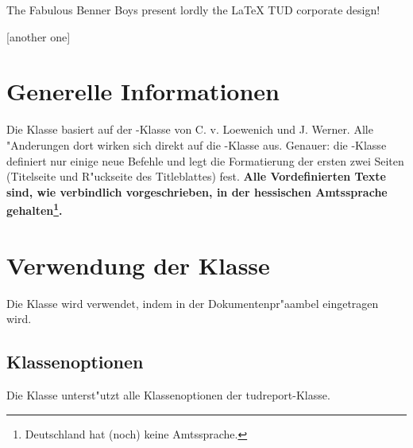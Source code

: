 \documentclass[article,dr=phil,type=drfinal,colorback,accentcolor=tud7b]{tudthesis}
\begin{document}
    {The Fabulous Benner Boys present lordly the {\LaTeX} TUD corporate design!}
  \author{Johnnie Walker}
  [another one]
  \dateofexam{\today}{\today}
  \makethesistitle

  \section{Generelle Informationen}
    Die Klasse basiert auf der -Klasse von C. v. Loewenich und
    J. Werner. Alle "Anderungen dort wirken sich direkt auf die
    -Klasse aus. Genauer: die -Klasse definiert nur einige
    neue Befehle und legt die Formatierung der ersten zwei Seiten (Titelseite
    und R"uckseite des Titleblattes) fest. \textbf{Alle Vordefinierten Texte sind, wie verbindlich vorgeschrieben, in der hessischen Amtssprache
    gehalten\footnote{Deutschland hat (noch) keine Amtssprache.}.}

  \section{Verwendung der Klasse}
    Die Klasse wird verwendet, indem in der Dokumentenpr"aambel
    eingetragen wird.

  \subsection{Klassenoptionen}
    Die Klasse unterst"utzt alle Klassenoptionen der tudreport-Klasse.
\end{document}
